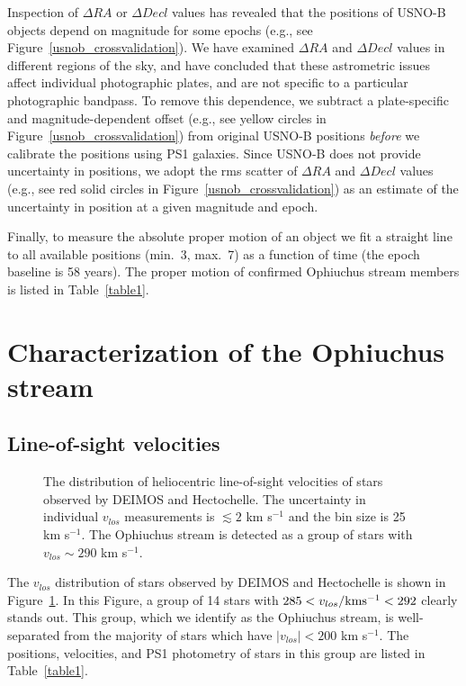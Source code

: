 \documentclass[iop]{emulateapj}
\begin{document}
Inspection of $\Delta RA$ or $\Delta Decl$ values has revealed that the
positions of USNO-B objects depend on magnitude for some epochs (e.g., see
Figure~\ref{usnob_crossvalidation}). We have examined $\Delta RA$ and
$\Delta Decl$ values in different regions of the sky, and have concluded that
these astrometric issues affect individual photographic plates, and are not
specific to a particular photographic bandpass. To remove this dependence, we
subtract a plate-specific and magnitude-dependent offset (e.g., see yellow
circles in Figure~\ref{usnob_crossvalidation}) from original USNO-B positions
{\em before} we calibrate the positions using PS1 galaxies. Since USNO-B does
not provide uncertainty in positions, we adopt the rms scatter of $\Delta RA$
and $\Delta Decl$ values (e.g., see red solid circles in
Figure~\ref{usnob_crossvalidation}) as an estimate of the uncertainty in
position at a given magnitude and epoch.

Finally, to measure the absolute proper motion of an object we fit a straight
line to all available positions (min.~3, max.~7) as a function of time (the
epoch baseline is 58 years). The proper motion of confirmed Ophiuchus stream
members is listed in Table~\ref{table1}.

\section{Characterization of the Ophiuchus stream}\label{results}

\subsection{Line-of-sight velocities\label{vlos}}

\begin{figure}
\caption{
The distribution of heliocentric line-of-sight velocities of stars observed by
DEIMOS and Hectochelle. The uncertainty in individual $v_{los}$ measurements is
$\lesssim2$ km s$^{-1}$ and the bin size is 25 km s$^{-1}$. The Ophiuchus stream
is detected as a group of stars with $v_{los}\sim290$ km s$^{-1}$.
\label{rv_hist}}
\end{figure}

The $v_{los}$ distribution of stars observed by DEIMOS and Hectochelle is shown
in Figure~\ref{rv_hist}. In this Figure, a group of 14 stars with
$285 < v_{los}/ {\rm km s^{-1}} < 292$ clearly stands out. This group, which we
identify as the Ophiuchus stream, is well-separated from the majority of stars
which have $|v_{los}|<200$ km s$^{-1}$. The positions, velocities, and PS1
photometry of stars in this group are listed in Table~\ref{table1}.
\end{document}
